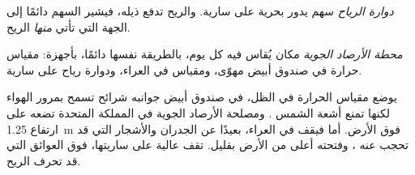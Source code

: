 \begin{definition}\label{def:g4:clouds-rain-snow:wind-vane}
\emph{دوارة الرياح} سهم يدور بحرية على سارية. والريح
تدفع ذيله، فيشير السهم دائمًا إلى الجهة التي تأتي \emph{منها}
الريح.
\end{definition}

\begin{definition}\label{def:g4:clouds-rain-snow:weather-station}
\emph{محطة الأرصاد الجوية} مكان يُقاس فيه
 كل يوم، بالطريقة نفسها دائمًا، بأجهزة: مقياس حرارة في صندوق أبيض
مهوّى، ومقياس  في العراء، ودوارة رياح على
سارية.
\end{definition}

يوضع مقياس الحرارة في الظل، في صندوق أبيض جوانبه شرائح تسمح بمرور الهواء
لكنها تمنع أشعة الشمس . ومصلحة الأرصاد الجوية في المملكة المتحدة
تضعه على ارتفاع
\SI{1.25}{\metre} فوق الأرض. أما 
فيقف في العراء، بعيدًا عن الجدران والأشجار التي قد تحجب عنه ،
وفتحته أعلى من الأرض بقليل.  تقف عالية على ساريتها، فوق
العوائق التي قد تحرف الريح.

